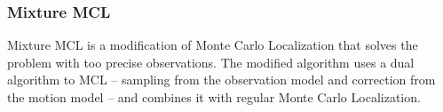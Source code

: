 \subsubsection{Mixture MCL}

Mixture MCL \cite{thrun99} is a modification of Monte Carlo Localization that
solves the problem with too precise observations.
The modified algorithm uses a dual algorithm to MCL -- sampling from
the observation model and correction from the motion model -- and combines it with
regular Monte Carlo Localization.
